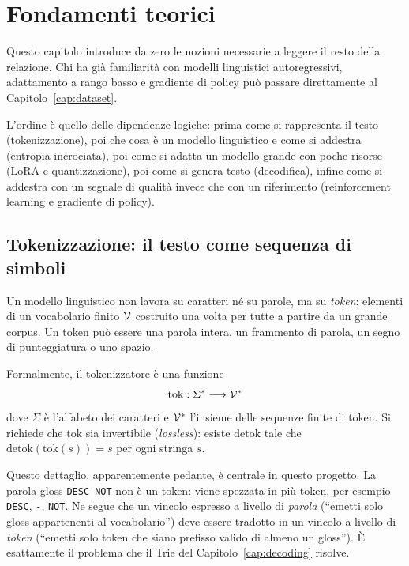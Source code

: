 \chapter{Fondamenti teorici}
\label{cap:fondamenti}

Questo capitolo introduce da zero le nozioni necessarie a leggere il resto della
relazione. Chi ha già familiarità con modelli linguistici autoregressivi,
adattamento a rango basso e gradiente di policy può passare direttamente al
Capitolo~\ref{cap:dataset}.

L'ordine è quello delle dipendenze logiche: prima come si rappresenta il testo
(tokenizzazione), poi che cosa è un modello linguistico e come si addestra
(entropia incrociata), poi come si adatta un modello grande con poche risorse
(LoRA e quantizzazione), poi come si genera testo (decodifica), infine come si
addestra con un segnale di qualità invece che con un riferimento
(reinforcement learning e gradiente di policy).

\section{Tokenizzazione: il testo come sequenza di simboli}

Un modello linguistico non lavora su caratteri né su parole, ma su \emph{token}:
elementi di un vocabolario finito $\mathcal{V}$ costruito una volta per tutte a
partire da un grande corpus. Un token può essere una parola intera, un
frammento di parola, un segno di punteggiatura o uno spazio.

Formalmente, il tokenizzatore è una funzione
\begin{equation}
  \mathrm{tok}: \Sigma^* \longrightarrow \mathcal{V}^*
\end{equation}
dove $\Sigma$ è l'alfabeto dei caratteri e $\mathcal{V}^*$ l'insieme delle sequenze
finite di token. Si richiede che $\mathrm{tok}$ sia invertibile
(\emph{lossless}): esiste $\mathrm{detok}$ tale che
$\mathrm{detok}(\mathrm{tok}(s)) = s$ per ogni stringa $s$.

Questo dettaglio, apparentemente pedante, è centrale in questo progetto. La
parola gloss \texttt{DESC-NOT} non è un token: viene spezzata in più token, per
esempio \texttt{DESC}, \texttt{-}, \texttt{NOT}. Ne segue che un vincolo
espresso a livello di \emph{parola} (``emetti solo gloss appartenenti al
vocabolario'') deve essere tradotto in un vincolo a livello di \emph{token}
(``emetti solo token che siano prefisso valido di almeno un gloss''). È
esattamente il problema che il Trie del Capitolo~\ref{cap:decoding} risolve.

